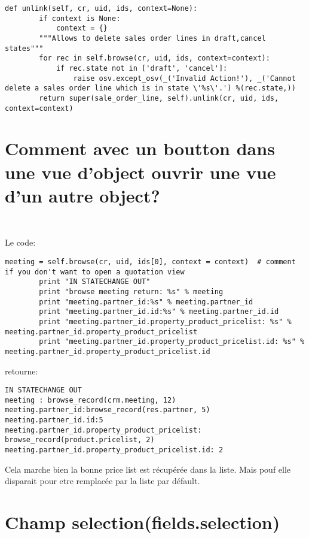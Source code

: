 \documentclass[12pt,a4paper]{article}
\begin{document}
\begin{verbatim}
def unlink(self, cr, uid, ids, context=None):
        if context is None:
            context = {}
        """Allows to delete sales order lines in draft,cancel states"""
        for rec in self.browse(cr, uid, ids, context=context):
            if rec.state not in ['draft', 'cancel']:
                raise osv.except_osv(_('Invalid Action!'), _('Cannot delete a sales order line which is in state \'%s\'.') %(rec.state,))
        return super(sale_order_line, self).unlink(cr, uid, ids, context=context)
\end{verbatim}

\section{Comment avec un boutton dans une vue d'object ouvrir une vue d'un autre object?}
\label{sec:open_view}

\begin{verbatim}
  
\end{verbatim}


Le code:

\begin{verbatim}
meeting = self.browse(cr, uid, ids[0], context = context)  # comment if you don't want to open a quotation view
        print "IN STATECHANGE OUT"
        print "browse meeting return: %s" % meeting
        print "meeting.partner_id:%s" % meeting.partner_id
        print "meeting.partner_id.id:%s" % meeting.partner_id.id
        print "meeting.partner_id.property_product_pricelist: %s" % meeting.partner_id.property_product_pricelist
        print "meeting.partner_id.property_product_pricelist.id: %s" % meeting.partner_id.property_product_pricelist.id
\end{verbatim}

retourne:


\begin{verbatim}
IN STATECHANGE OUT
meeting : browse_record(crm.meeting, 12)
meeting.partner_id:browse_record(res.partner, 5)
meeting.partner_id.id:5
meeting.partner_id.property_product_pricelist: browse_record(product.pricelist, 2)
meeting.partner_id.property_product_pricelist.id: 2
\end{verbatim}

Cela marche bien la bonne price list est récupérée dans la liste. Mais pouf elle disparait pour etre remplacée par la liste par défault. 


\section{Champ selection(fields.selection)}
\label{sec:selection_fields}
\end{document}
